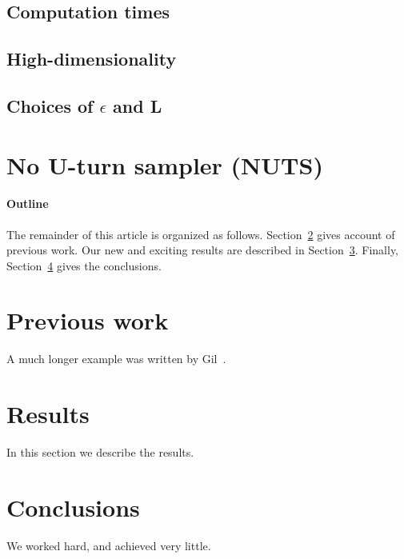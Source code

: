 \documentclass[12pt]{article}
\begin{document}
\subsection{Computation times}
\subsection{High-dimensionality}
\subsection{Choices of $\epsilon$ and L}

\section{No U-turn sampler (NUTS)}



\paragraph{Outline}
The remainder of this article is organized as follows.
Section~\ref{previous work} gives account of previous work.
Our new and exciting results are described in Section~\ref{results}.
Finally, Section~\ref{conclusions} gives the conclusions.

\section{Previous work}\label{previous work}
A much longer \LaTeXe{} example was written by Gil~\cite{Gil:02}.

\section{Results}\label{results}
In this section we describe the results.

\section{Conclusions}\label{conclusions}
We worked hard, and achieved very little.



\end{document}

